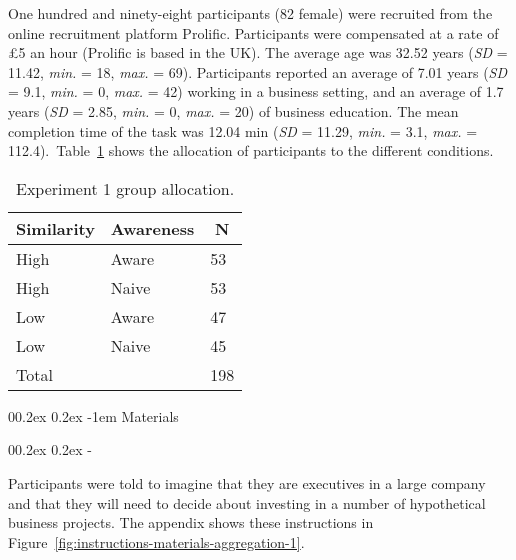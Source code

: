 \documentclass[
  english,
  man, donotrepeattitle,floatsintext]{apa7}
\makeatletter
\let\oldparagraph\paragraph
\renewcommand{\paragraph}[1]{\oldparagraph{#1}\mbox{}}
\let\oldsubparagraph\subparagraph
\renewcommand{\subparagraph}[1]{\oldsubparagraph{#1}\mbox{}}
\renewcommand{\paragraph}{\@startsection{paragraph}{4}{\parindent}%
  {0\baselineskip \@plus 0.2ex \@minus 0.2ex}%
  {-1em}%
  {\normalfont\normalsize\bfseries\itshape\typesectitle}}
\renewcommand{\subparagraph}[1]{\@startsection{subparagraph}{5}{1em}%
  {0\baselineskip \@plus 0.2ex \@minus 0.2ex}%
  {-\z@\relax}%
  {\normalfont\normalsize\itshape\hspace{\parindent}{#1}\textit{\addperi}}{\relax}}
\theoremstyle{definition}
\theoremstyle{definition}
\theoremstyle{definition}
\theoremstyle{definition}
\theoremstyle{remark}
\makeatother
\begin{document}
One hundred and ninety-eight participants (82 female) were recruited from the online recruitment platform Prolific. Participants were compensated at a rate of \pounds 5 an hour (Prolific is based in the UK). The average age was 32.52 years (\emph{SD} = 11.42, \emph{min.} = 18, \emph{max.} = 69). Participants reported an average of 7.01 years (\emph{SD} = 9.1, \emph{min.} = 0, \emph{max.} = 42) working in a business setting, and an average of 1.7 years (\emph{SD} = 2.85, \emph{min.} = 0, \emph{max.} = 20) of business education. The mean completion time of the task was 12.04 min (\emph{SD} = 11.29, \emph{min.} = 3.1, \emph{max.} = 112.4).~Table~\ref{tab:condition-allocation-aggregation-1}
shows the allocation of participants to the different conditions.

\begin{table}[tbp]

\begin{center}
\begin{threeparttable}

\caption{\label{tab:condition-allocation-aggregation-1}Experiment 1 group allocation.}

\begin{tabular}{lll}
\toprule
Similarity & \multicolumn{1}{c}{Awareness} & \multicolumn{1}{c}{N}\\
\midrule
High & Aware & 53\\
High & Naive & 53\\
Low & Aware & 47\\
Low & Naive & 45\\
Total &  & 198\\
\bottomrule
\end{tabular}

\end{threeparttable}
\end{center}

\end{table}

\hypertarget{materials}{%
\paragraph{Materials}\label{materials}}

\hypertarget{instructions-materials-aggregation-1}{%
\subparagraph{Instructions}\label{instructions-materials-aggregation-1}}

Participants were told to imagine that they are executives in a large company
and that they will need to decide about investing in a number of hypothetical
business projects. The appendix shows these instructions in
Figure~\ref{fig:instructions-materials-aggregation-1}.
\end{document}
